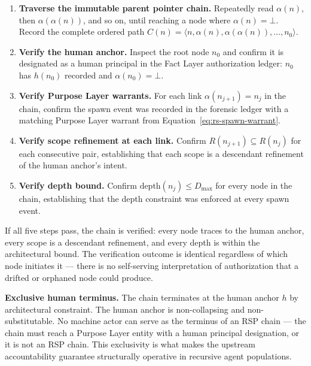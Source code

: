\begin{enumerate}
    \item[(V1)] \textbf{Traverse the immutable parent pointer chain.} Repeatedly read $\alpha(n)$, then $\alpha(\alpha(n))$, and so on, until reaching a node where $\alpha(n) = \bot$. Record the complete ordered path $C(n) = \langle n, \alpha(n), \alpha(\alpha(n)), \ldots, n_0 \rangle$.

    \item[(V2)] \textbf{Verify the human anchor.} Inspect the root node $n_0$ and confirm it is designated as a human principal in the Fact Layer authorization ledger: $n_0$ has $h(n_0)$ recorded and $\alpha(n_0) = \bot$.

    \item[(V3)] \textbf{Verify Purpose Layer warrants.} For each link $\alpha(n_{j+1}) = n_j$ in the chain, confirm the spawn event was recorded in the forensic ledger with a matching Purpose Layer warrant from Equation~\ref{eq:rs-spawn-warrant}.

    \item[(V4)] \textbf{Verify scope refinement at each link.} Confirm $R(n_{j+1}) \subseteq R(n_j)$ for each consecutive pair, establishing that each scope is a descendant refinement of the human anchor's intent.

    \item[(V5)] \textbf{Verify depth bound.} Confirm $\text{depth}(n_j) \leq D_{\max}$ for every node in the chain, establishing that the depth constraint was enforced at every spawn event.
\end{enumerate}

If all five steps pass, the chain is verified: every node traces to the human anchor, every scope is a descendant refinement, and every depth is within the architectural bound. The verification outcome is identical regardless of which node initiates it — there is no self-serving interpretation of authorization that a drifted or orphaned node could produce.

\medskip
\noindent\textbf{Exclusive human terminus.} The chain terminates at the human anchor $h$ by architectural constraint. The human anchor is non-collapsing and non-substitutable. No machine actor can serve as the terminus of an RSP chain — the chain must reach a Purpose Layer entity with a human principal designation, or it is not an RSP chain. This exclusivity is what makes the \bxthree{} upstream accountability guarantee structurally operative in recursive agent populations.


